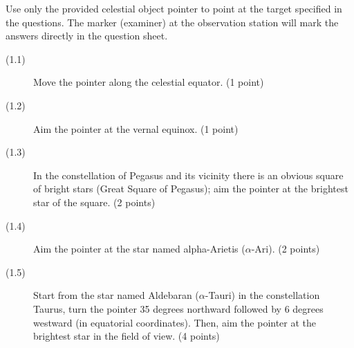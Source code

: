 Use only the provided celestial object pointer to point at the target
specified in the questions. The marker (examiner) at the observation station
will mark the answers directly in the question sheet.

\begin{description}
\item[(1.1)] Move the pointer along the celestial equator. \hfill(1 point)
\item[(1.2)] Aim the pointer at the vernal equinox. \hfill(1 point)
\item[(1.3)] In the constellation of Pegasus and its vicinity there is an
  obvious square of bright stars (Great Square of Pegasus); aim the pointer
  at the brightest star of the square. \hfill(2 points)
\item[(1.4)] Aim the pointer at the star named alpha-Arietis
  ($\alpha$-Ari). \hfill(2 points)
\item[(1.5)] Start from the star named Aldebaran ($\alpha$-Tauri) in the
  constellation Taurus, turn the pointer 35 degrees northward followed by 6
  degrees westward (in equatorial coordinates). Then, aim the pointer at the
  brightest star in the field of view. \hfill(4 points)
\end{description}
